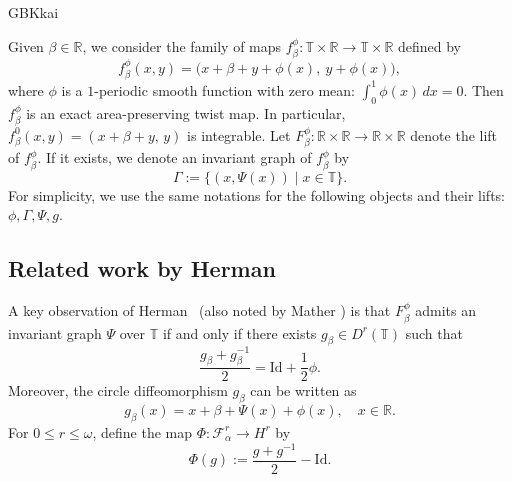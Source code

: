 \documentclass{amsart}
\theoremstyle{definition}
\begin{document}
\begin{CJK*}{GBK}{kai}
		
		
		
		
		Given $\beta \in \mathbb{R}$, we consider the family of maps \( f_\beta^{\phi} : \mathbb{T} \times \mathbb{R} \to \mathbb{T} \times \mathbb{R} \) defined by
\begin{equation}\label{Fpar}
f_\beta^{\phi}(x, y) = \bigl(x + \beta + y + \phi(x),\ y + \phi(x)\bigr),
\end{equation}
where \( \phi \) is a \(1\)-periodic smooth function with zero mean: \( \int_0^1 \phi(x)\, dx = 0 \). Then \( f_\beta^{\phi} \) is an exact area-preserving twist map. In particular, \( f_\beta^0(x,y) = (x + \beta + y,\, y) \) is integrable. Let \( F_\beta^{\phi} : \mathbb{R} \times \mathbb{R} \to \mathbb{R} \times \mathbb{R} \) denote the lift of \( f_\beta^{\phi} \). If it exists, we denote an invariant graph of \( f_\beta^{\phi} \) by
\[
\Gamma := \{(x, \Psi(x)) \mid x \in \mathbb{T}\}.
\]
For simplicity, we use the same notations for the following objects and their lifts: \( \phi, \Gamma, \Psi, g \).


\subsection{Related work by Herman}



A key observation of Herman~\cite{H1} (also noted by Mather \cite{M1}) is that \( F_\beta^{\phi} \) admits an invariant graph \( \Psi \) over \( \mathbb{T} \) if and only if there exists \( g_\beta \in D^r(\mathbb{T}) \) such that
\begin{equation}\label{hrfo}
\frac{g_\beta + g_\beta^{-1}}{2} = \mathrm{Id} + \frac{1}{2} \phi.
\end{equation}
Moreover, the circle diffeomorphism \( g_\beta \) can be written as
\[
g_\beta(x) = x + \beta + \Psi(x) + \phi(x), \quad x \in \mathbb{R}.
\]
For \( 0 \leq r \leq \omega \), define the map \( \Phi: \mathcal{F}_\alpha^r \to {H}^r \) by
\[
\Phi(g) := \frac{g + g^{-1}}{2} - \mathrm{Id}.
\]


\end{CJK*}
\end{document}

